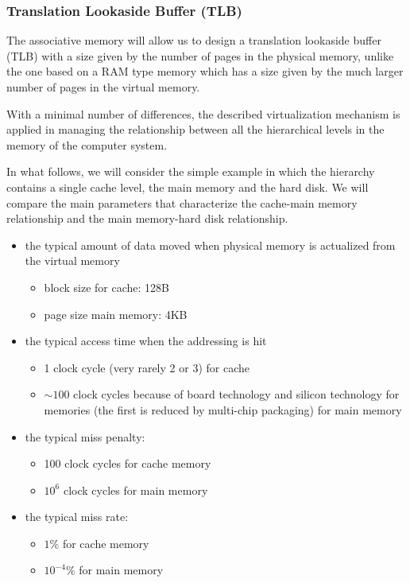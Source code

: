 \subsubsection{Translation Lookaside Buffer (TLB)}

The associative memory will allow us to design a translation lookaside buffer (TLB) with a size given by the number of pages in the physical memory, unlike the one based on a RAM type memory which has a size given by the much larger number of pages in the virtual memory.

With a minimal number of differences, the described virtualization mechanism is applied in managing the relationship between all the hierarchical levels in the memory of the computer system.

In what follows, we will consider the simple example in which the hierarchy contains a single cache level, the main memory and the hard disk. We will compare the main parameters that characterize the  cache-main memory relationship and the main memory-hard disk relationship.
\begin{itemize}
    \item the typical amount of data moved when physical memory is actualized from the virtual memory
        \begin{itemize}
            \item block size for cache: 128B
            \item page size main memory: 4KB
        \end{itemize}
    \item the typical access time when the addressing is hit
        \begin{itemize}
            \item 1 clock cycle (very rarely 2 or 3) for cache
            \item $\sim 100$ clock cycles because of board technology and silicon technology for memories (the first is reduced by multi-chip packaging) for main memory
        \end{itemize}
    \item the typical miss penalty:
        \begin{itemize}
            \item 100 clock cycles for cache memory
            \item $10^6$ clock cycles for main memory
        \end{itemize}
    \item the typical miss rate:
        \begin{itemize}
            \item $1\%$ for cache memory
            \item $10^{-4}\%$ for main memory
        \end{itemize}
\end{itemize}


